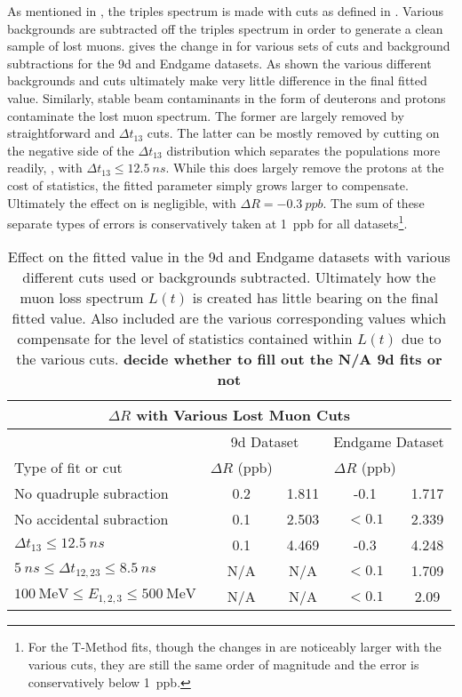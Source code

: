 As mentioned in , the triples spectrum is made with cuts as defined in . Various backgrounds are subtracted off the triples spectrum in order to generate a clean sample of lost muons.  gives the change in \R for various sets of cuts and background subtractions for the 9d and Endgame datasets. As shown the various different backgrounds and cuts ultimately make very little difference in the final fitted \R value. Similarly, stable beam contaminants in the form of deuterons and protons contaminate the lost muon spectrum. The former are largely removed by straightforward \DT and $\Delta t_{13}$ cuts. The latter can be mostly removed by cutting on the negative side of the $\Delta t_{13}$ distribution which separates the populations more readily, , with $\Delta t_{13} \leq \SI{12.5}{ns}$. While this does largely remove the protons at the cost of statistics, the fitted \K parameter simply grows larger to compensate. Ultimately the effect on \R is negligible, with $\Delta R = \SI{-0.3}{ppb}$. The sum of these separate types of errors is conservatively taken at \SI{1}{ppb} for all datasets\footnote{For the T-Method fits, though the changes in \R are noticeably larger with the various cuts, they are still the same order of magnitude and the error is conservatively below \SI{1}{ppb}.}.


\begin{table}[]
\centering
\setlength\tabcolsep{10pt}
\renewcommand{\arraystretch}{1.2}
\begin{tabular*}{1\linewidth}{@{\extracolsep{\fill}}lcccc}
  \hline
    \multicolumn{5}{c}{\textbf{$\Delta R$ with Various Lost Muon Cuts}} \\
  \hline\hline
    & \multicolumn{2}{c}{9d Dataset} & \multicolumn{2}{c}{Endgame Dataset} \\
  \hline
    Type of fit or cut & $\Delta R$ (ppb) & \K & $\Delta R$ (ppb) & \K \\
  \hline
    No quadruple subraction & 0.2 & 1.811 & -0.1 & 1.717 \\
    No accidental subraction & 0.1 & 2.503 & $<0.1$ & 2.339 \\
    $\Delta t_{13} \leq \SI{12.5}{ns}$ & 0.1 & 4.469 & -0.3 & 4.248 \\
    $\SI{5}{ns} \leq \Delta t_{12, 23} \leq \SI{8.5}{ns}$ & N/A & N/A & $<0.1$ & 1.709 \\
    $\SI{100}{\MeV} \leq E_{1,2,3} \leq \SI{500}{\MeV}$ & N/A & N/A & $<0.1$ & 2.09 \\
  \hline 
\end{tabular*}
\caption[Effect on fitted R value due to lost muon cuts in the 9d and Endgame datasets]{Effect on the fitted \R value in the 9d and Endgame datasets with various different cuts used or backgrounds subtracted. Ultimately how the muon loss spectrum $L(t)$ is created has little bearing on the final fitted \R value. Also included are the various corresponding \K values which compensate for the level of statistics contained within $L(t)$ due to the various cuts. \textbf{decide whether to fill out the N/A 9d fits or not}}
\label{tab:lostmuonsvariousfits}
\end{table}


